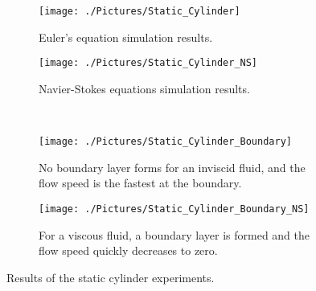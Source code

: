 \documentclass[10pt, titlepage]{article}
\begin{document}
\begin{figure}[htbp]
\centering
\begin{subfigure}[t]{0.5\textwidth}
  \centering
  \texttt{[image: ./Pictures/Static\_Cylinder]}
  \caption{Euler's equation simulation results.}
  \label{fig:staticeuler}
\end{subfigure}%
\begin{subfigure}[t]{0.5\textwidth}
  \centering
  \texttt{[image: ./Pictures/Static\_Cylinder\_NS]}
  \caption{Navier-Stokes equations simulation results.}
  \label{fig:staticNS}
\end{subfigure} \\
\begin{subfigure}[t]{0.5\textwidth}
 \centering
 \texttt{[image: ./Pictures/Static\_Cylinder\_Boundary]}
 \caption{No boundary layer forms for an inviscid fluid, and the flow speed is the fastest at the boundary.}
 \label{fig:eulerboundary}
\end{subfigure}%
\begin{subfigure}[t]{0.5\textwidth}
 \centering
 \texttt{[image: ./Pictures/Static\_Cylinder\_Boundary\_NS]}
 \caption{For a viscous fluid, a boundary layer is formed and the flow speed quickly decreases to zero.}
 \label{fig:nsboundary}
\end{subfigure}
\caption[Static Cylinder Results]{Results of the static cylinder experiments.}
\label{fig:static}
\end{figure}
\end{document}
